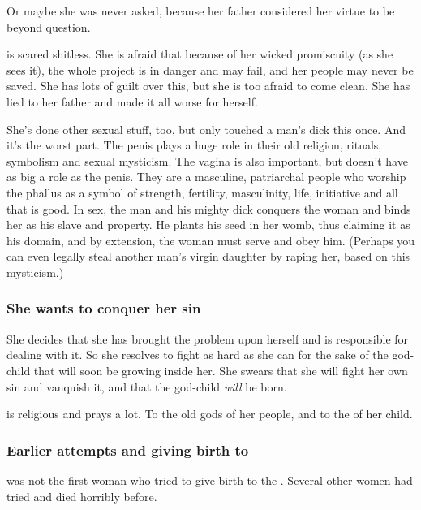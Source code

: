 Or maybe she was never asked, because her father considered her virtue to be beyond question. 

\Ilu{} is scared shitless. She is afraid that because of her wicked promiscuity (as she sees it), the whole project is in danger and may fail, and her people may never be saved. She has lots of guilt over this, but she is too afraid to come clean. She has lied to her father and made it all worse for herself. 

She's done other sexual stuff, too, but only touched a man's dick this once. And it's the worst part. The penis plays a huge role in their old religion, rituals, symbolism and sexual mysticism. The vagina is also important, but doesn't have as big a role as the penis. They are a masculine, patriarchal people who worship the phallus as a symbol of strength, fertility, masculinity, life, initiative and all that is good. In sex, the man and his mighty dick conquers the woman and binds her as his slave and property. He plants his seed in her womb, thus claiming it as his domain, and by extension, the woman must serve and obey him. (Perhaps you can even legally steal another man's virgin daughter by raping her, based on this mysticism.)





\subsubsection{She wants to conquer her sin}
She decides that she has brought the problem upon herself and is responsible for dealing with it. So she resolves to fight as hard as she can for the sake of the god-child that will soon be growing inside her. She swears that she will fight her own sin and vanquish it, and that the god-child \emph{will} be born. 

\Ilu{} is religious and prays a lot. To the old gods of her people, and to \dash the  of her child.





\subsubsection{Earlier attempts and giving birth to \resphain}
\Ilu{} was not the first woman who tried to give birth to the \banemessiah. Several other women had tried and died horribly before. 


